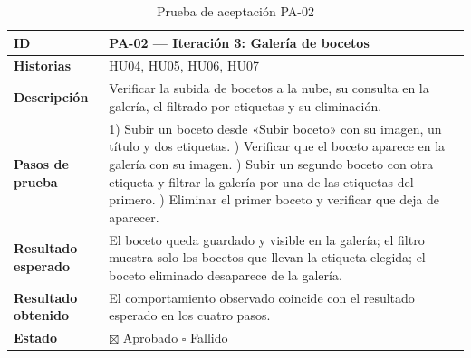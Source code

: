 \documentclass[12pt,letterpaper,oneside]{report}
\begin{document}
\begin{table}[H]
  \centering
  \caption{Prueba de aceptación PA-02}
  \label{tab:pa02anexo}
  \renewcommand{\arraystretch}{1.3}
  \small
  \begin{tabular}{|>{\raggedright\arraybackslash}p{3.6cm}|p{9.4cm}|}
    \hline
    \textbf{ID} & PA-02 — Iteración 3: Galería de bocetos \\ \hline
    \textbf{Historias} & HU04, HU05, HU06, HU07 \\ \hline
    \textbf{Descripción} & Verificar la subida de bocetos a la nube, su consulta en la galería, el filtrado por etiquetas y su eliminación. \\ \hline
    \textbf{Pasos de prueba} &
      1) Subir un boceto desde «Subir boceto» con su imagen, un título y dos etiquetas. \newline
      2) Verificar que el boceto aparece en la galería con su imagen. \newline
      3) Subir un segundo boceto con otra etiqueta y filtrar la galería por una de las etiquetas del primero. \newline
      4) Eliminar el primer boceto y verificar que deja de aparecer. \\ \hline
    \textbf{Resultado esperado} & El boceto queda guardado y visible en la galería; el filtro muestra solo los bocetos que llevan la etiqueta elegida; el boceto eliminado desaparece de la galería. \\ \hline
    \textbf{Resultado obtenido} & El comportamiento observado coincide con el resultado esperado en los cuatro pasos. \\ \hline
    \textbf{Estado} & $\boxtimes$ Aprobado \qquad $\square$ Fallido \\ \hline
  \end{tabular}
\end{table}
\end{document}
